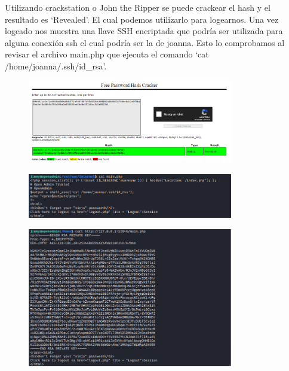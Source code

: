 \documentclass{article}
\begin{document}
Utilizando crackstation o John the Ripper se puede crackear el hash y el resultado es `Revealed'. El cual podemos utilizarlo para logearnos. Una vez logeado nos muestra una llave SSH encriptada que podría ser utilizada para alguna conexión ssh el cual podría ser la de joanna. Esto lo comprobamos al revisar el archivo main.php que ejecuta el comando `cat /home/joanna/.ssh/id\_rsa'.
\begin{figure}[H]
	\center
	\includegraphics[width=0.8\textwidth]{images/openadmin/13-crackstation.png}
	\caption{}
\end{figure}

\begin{figure}[H]
	\center
	\includegraphics[width=0.8\textwidth]{images/openadmin/14-mainphp.png}
	\caption{}
\end{figure}

\begin{figure}[H]
	\center
	\includegraphics[width=0.8\textwidth]{images/openadmin/15-joannarsa.png}
	\caption{}
\end{figure}
\end{document}
